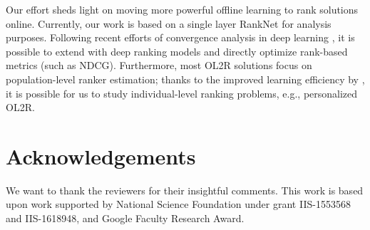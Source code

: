 \documentclass[sigconf]{acmart}
\theoremstyle{definition}
\theoremstyle{remark}
\begin{document}
Our effort sheds light on moving more powerful offline learning to rank solutions online. Currently, our work is based on a single layer RankNet for analysis purposes. Following recent efforts of convergence analysis in deep learning \cite{zhou2019neural}, it is possible to extend \model{} with deep ranking models and directly optimize rank-based metrics (such as NDCG). Furthermore, most OL2R solutions focus on population-level ranker estimation; thanks to the improved learning efficiency by \model{}, it is possible for us to study individual-level ranking problems, e.g., personalized OL2R.

\section{Acknowledgements}
We want to thank the reviewers for their insightful comments. This work is based upon work supported by National Science Foundation under grant IIS-1553568 and IIS-1618948, and Google Faculty Research Award.






\appendix

\end{document}
